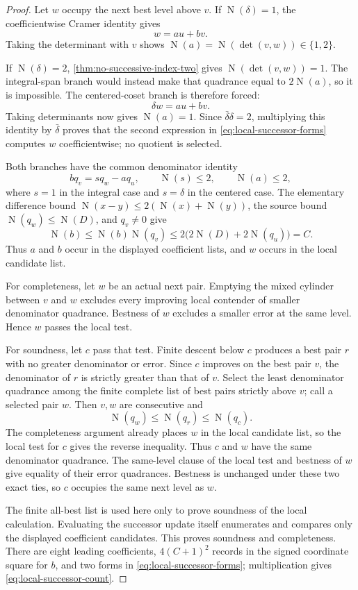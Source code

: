 \documentclass[11pt]{article}
\newcommand{\Norm}[1]{\operatorname{N}\!\left(#1\right)}
\begin{document}
\begin{proof}
Let $w$ occupy the next best level above $v$.  If $\Norm\delta=1$, the
coefficientwise Cramer identity gives
\[
                              w=au+bv.
\]
Taking the determinant with $v$ shows
$\Norm a=\Norm{\det(v,w)}\in\{1,2\}$.

If $\Norm\delta=2$, \cref{thm:no-successive-index-two} gives
$\Norm{\det(v,w)}=1$.  The integral-span branch would instead make that
quadrance equal to $2\Norm a$, so it is impossible.  The centered-coset
branch is therefore forced:
\[
                              \delta w=au+bv.
\]
Taking determinants now gives $\Norm a=1$.  Since
$\bar\delta\delta=2$, multiplying this identity by $\bar\delta$ proves that
the second expression in \eqref{eq:local-successor-forms} computes $w$
coefficientwise; no quotient is selected.

Both branches have the common denominator identity
\[
     bq_v=sq_w-aq_u,
     \qquad \Norm s\le2,
     \qquad \Norm a\le2,
\]
where $s=1$ in the integral case and $s=\delta$ in the centered case.
The elementary difference bound
$\Norm{x-y}\le2(\Norm x+\Norm y)$, the source bound
$\Norm{q_w}\le\Norm D$, and $q_v\ne0$ give
\[
 \Norm b
 \le \Norm b\Norm{q_v}
 \le 2\bigl(2\Norm D+2\Norm{q_u}\bigr)=C.
\]
Thus $a$ and $b$ occur in the displayed coefficient lists, and $w$ occurs in
the local candidate list.

For completeness, let $w$ be an actual next pair.  Emptying the mixed cylinder
between $v$ and $w$ excludes every improving local contender of smaller
denominator quadrance.  Bestness of $w$ excludes a smaller error at the same
level.  Hence $w$ passes the local test.

For soundness, let $c$ pass that test.  Finite descent below $c$ produces a
best pair $r$ with no greater denominator or error.  Since $c$ improves on the
best pair $v$, the denominator of $r$ is strictly greater than that of $v$.
Select the least denominator quadrance among the finite complete list of best
pairs strictly above $v$; call a selected pair $w$.  Then $v,w$ are
consecutive and
\[
                  \Norm{q_w}\le\Norm{q_r}\le\Norm{q_c}.
\]
The completeness argument already places $w$ in the local candidate list, so
the local test for $c$ gives the reverse inequality.  Thus $c$ and $w$ have
the same denominator quadrance.  The same-level clause of the local test and
bestness of $w$ give equality of their error quadrances.  Bestness is unchanged
under these two exact ties, so $c$ occupies the same next level as $w$.

The finite all-best list is used here only to prove soundness of the local
calculation.  Evaluating the successor update itself enumerates and compares
only the displayed coefficient candidates.  This proves soundness and
completeness.
There are eight leading coefficients, $4(C+1)^2$ records in the signed
coordinate square for $b$, and two forms in
\eqref{eq:local-successor-forms}; multiplication gives
\eqref{eq:local-successor-count}.
\end{proof}
\end{document}
